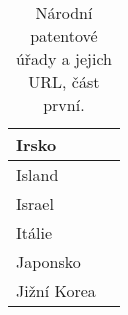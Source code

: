 \begin{table}[H]
\begin{tabular}{|>{\centering\arraybackslash}p{2.2cm}|>{\centering\arraybackslash}p{9cm}|}
	\hline
	Irsko & \MYhref{https://www.ipoi.gov.ie/en/}{https://www.ipoi.gov.ie/en/}\\
	\hline
	Island & \MYhref{https://www.isipo.is/}{https://www.isipo.is/} \\
	\hline
	Israel & \MYhref{https://www.gov.il/en/departments/ilpo}{https://www.gov.il/en/departments/ilpo} \\
	\hline
	Itálie & \MYhref{https://uibm.mise.gov.it/index.php/it/}{https://uibm.mise.gov.it/index.php/it/}\\
	\hline
	Japonsko & \MYhref{https://www.jpo.go.jp/e/index.html}{https://www.jpo.go.jp/e/index.htm}\\
	\hline
	Jižní Korea & \MYhref{http://www.kipo.go.kr/}{http://www.kipo.go.kr/} \\
	\hline	
	\end{tabular}
	\caption{Národní patentové úřady a jejich URL, část první.}
	\label{tab:table_offices1_url}
	\end{table}
\newpage
